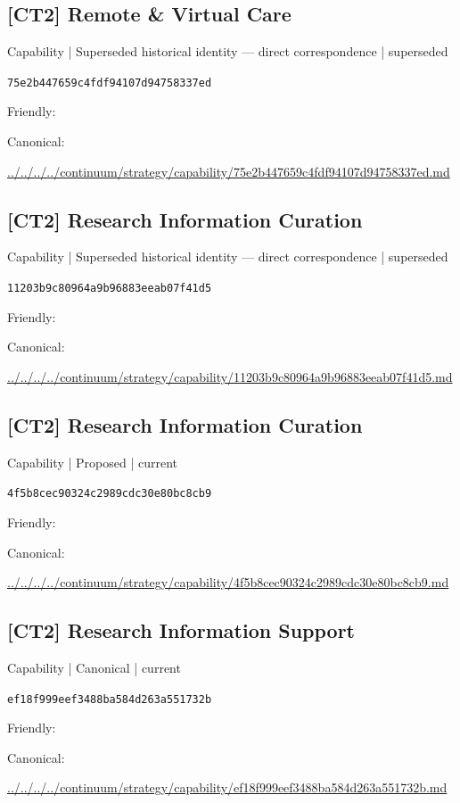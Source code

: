 \documentclass[10pt,a4paper]{article}
\begin{document}
\subsection*{[CT2] Remote \& Virtual Care}
{\small Capability | Superseded historical identity — direct correspondence | superseded}\par
\texttt{75e2b447659c4fdf94107d94758337ed}\par
Friendly: \par
Canonical: \par
{\footnotesize\url{../../../../continuum/strategy/capability/75e2b447659c4fdf94107d94758337ed.md}}\par
\subsection*{[CT2] Research Information Curation}
{\small Capability | Superseded historical identity — direct correspondence | superseded}\par
\texttt{11203b9c80964a9b96883eeab07f41d5}\par
Friendly: \par
Canonical: \par
{\footnotesize\url{../../../../continuum/strategy/capability/11203b9c80964a9b96883eeab07f41d5.md}}\par
\subsection*{[CT2] Research Information Curation}
{\small Capability | Proposed | current}\par
\texttt{4f5b8cec90324c2989cdc30e80bc8cb9}\par
Friendly: \par
Canonical: \par
{\footnotesize\url{../../../../continuum/strategy/capability/4f5b8cec90324c2989cdc30e80bc8cb9.md}}\par
\subsection*{[CT2] Research Information Support}
{\small Capability | Canonical | current}\par
\texttt{ef18f999eef3488ba584d263a551732b}\par
Friendly: \par
Canonical: \par
{\footnotesize\url{../../../../continuum/strategy/capability/ef18f999eef3488ba584d263a551732b.md}}\par
\end{document}
